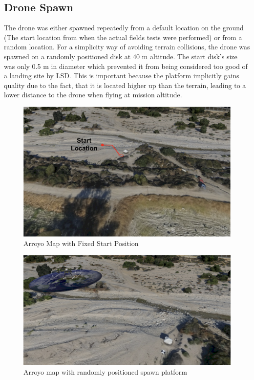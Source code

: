\subsection{Drone Spawn}
The drone was either spawned repeatedly from a default location on the ground (The start location from when the actual fields tests were performed) or from a random location. For a simplicity way of  avoiding terrain collisions, the drone was spawned on a randomly positioned disk at 40 m altitude. The start disk's size was only 0.5 m in diameter which prevented it from being considered too good of a landing site by LSD. This is important because the platform implicitly gains quality due to the fact, that it is located higher up than the terrain, leading to a lower distance to the drone when flying at mission altitude.
\begin{figure}[h]
    \centering
    \includegraphics[scale=0.42]{images/evaluation/arroyo_with_start.png}
    \caption{Arroyo Map with Fixed Start Position}
    \label{fig:fixed_start}
\end{figure}
\begin{figure}[h]
    \centering
    \includegraphics[scale=0.2]{images/evaluation/arroyo_with_platform.png}
    \caption{Arroyo map with randomly positioned spawn platform}
    \label{fig:random_start}
\end{figure}
\clearpage %

